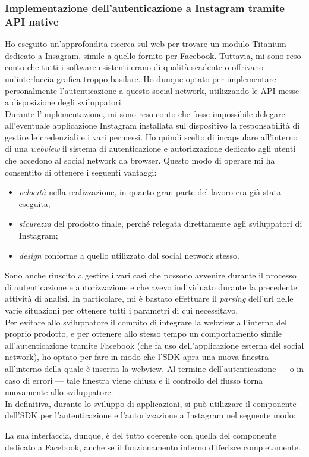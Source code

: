 			\subsubsection{Implementazione dell'autenticazione a Instagram tramite API native}
				Ho eseguito un'approfondita ricerca sul web per trovare un modulo Titanium dedicato a Insagram, simile a quello
				fornito per Facebook. Tuttavia, mi sono reso conto che tutti i software esistenti erano di qualità scadente o
				offrivano un'interfaccia grafica troppo basilare. Ho dunque optato per implementare personalmente l'autenticazione
				a questo social network, utilizzando le API messe a disposizione degli sviluppatori.\\
				Durante l'implementazione, mi sono reso conto che fosse impossibile delegare all'eventuale applicazione Instagram
				installata sul dispositivo la responsabilità di gestire le credenziali e i vari permessi. Ho quindi scelto di
				incapsulare all'interno di una \emph{webview} il sistema di autenticazione e autorizzazione dedicato agli utenti che
				accedono al social network da browser. Questo modo di operare mi ha consentito di ottenere i seguenti vantaggi:
				\begin{itemize}
					\item \emph{velocità} nella realizzazione, in quanto gran parte del lavoro era già stata eseguita;
					\item \emph{sicurezza} del prodotto finale, perché relegata direttamente agli sviluppatori di Instagram;
					\item \emph{design} conforme a quello utilizzato dal social network stesso.
				\end{itemize}
				Sono anche riuscito a gestire i vari casi che possono avvenire durante il processo di autenticazione e autorizzazione
				e che avevo individuato durante la precedente attività di analisi. In particolare, mi è bastato effettuare il
				\emph{parsing} dell'url nelle varie situazioni per ottenere tutti i parametri di cui necessitavo.\\
				Per evitare allo sviluppatore il compito di integrare la webview all'interno del proprio prodotto, e per ottenere allo
				stesso tempo un comportamento simile all'autenticazione tramite Facebook (che fa uso dell'applicazione esterna del
				social network), ho optato per fare in modo che l'SDK apra una nuova finestra all'interno della quale è inserita la
				webview. Al termine dell'autenticazione — o in caso di errori — tale finestra viene chiusa e il controllo del flusso
				torna nuovamente allo sviluppatore.\\
				In definitiva, durante lo sviluppo di applicazioni, si può utilizzare il componente dell'SDK per l'autenticazione e
				l'autorizzazione a Instagram nel seguente modo:
				
				La sua interfaccia, dunque, è del tutto coerente con quella del componente dedicato a Facebook, anche se il
				funzionamento interno differisce completamente.
